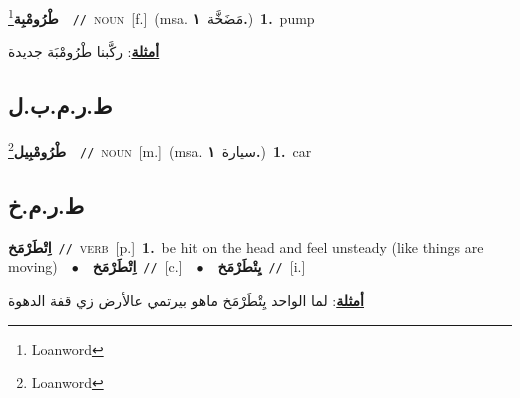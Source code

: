 \documentclass[10pt,a4paper,twoside]{article} %
\begin{document}
\begin{multicols}{2}
{\setlength\topsep{0pt}\textbf{\foreignlanguage{arabic}{طْرُومْبِة}}\footnote{Loanword}\ \ {\color{gray}\texttt{//}\color{black}}\ \textsc{noun}\ [f.]\ \color{gray}(msa. \foreignlanguage{arabic}{مَضَخَّة}~\foreignlanguage{arabic}{\textbf{١.}})\color{black}\ \textbf{1.}~pump\  \begin{flushright}\color{gray}\foreignlanguage{arabic}{\textbf{\underline{\foreignlanguage{arabic}{أمثلة}}}: ركَّبنا طْرُومْبَة جديدة}\end{flushright}\color{black}} \vspace{2mm}

\vspace{-3mm}
\subsection*{\color{blue}\foreignlanguage{arabic}{ط.ر.م.ب.ل}\color{blue}{ (ntws)}} 

{\setlength\topsep{0pt}\textbf{\foreignlanguage{arabic}{طْرُومْبِيل}}\footnote{Loanword}\ \ {\color{gray}\texttt{//}\color{black}}\ \textsc{noun}\ [m.]\ \color{gray}(msa. \foreignlanguage{arabic}{سيارة}~\foreignlanguage{arabic}{\textbf{١.}})\color{black}\ \textbf{1.}~car\ } \vspace{2mm}

\vspace{-3mm}
\subsection*{\color{blue}\foreignlanguage{arabic}{ط.ر.م.خ}\color{blue}{}} 

{\setlength\topsep{0pt}\textbf{\foreignlanguage{arabic}{اِتْطَرْمَخ}}\ {\color{gray}\texttt{//}\color{black}}\ \textsc{verb}\ [p.]\ \textbf{1.}~be hit on the head and feel unsteady (like things are moving)\ \ $\bullet$\ \ \setlength\topsep{0pt}\textbf{\foreignlanguage{arabic}{اِتْطَرْمَخ}}\ {\color{gray}\texttt{//}\color{black}}\ [c.]\ \ $\bullet$\ \ \setlength\topsep{0pt}\textbf{\foreignlanguage{arabic}{يِتْطَرْمَخ}}\ {\color{gray}\texttt{//}\color{black}}\ [i.]\  \begin{flushright}\color{gray}\foreignlanguage{arabic}{\textbf{\underline{\foreignlanguage{arabic}{أمثلة}}}: لما الواحد يِتْطَرْمَخ ماهو بيرتمي عالأرض زي قفة الدهوة}\end{flushright}\color{black}} \vspace{2mm}


\end{multicols}
\end{document}
